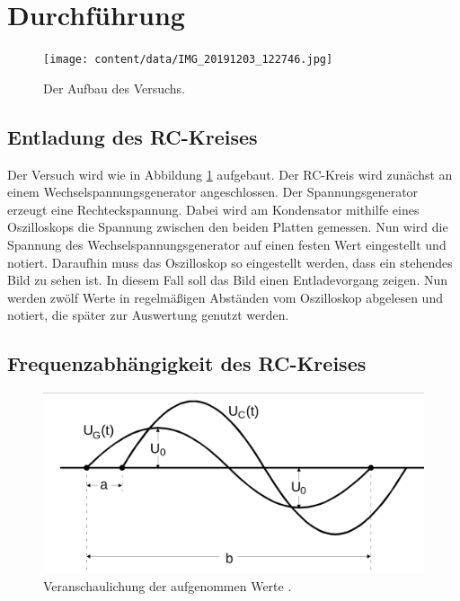 \section{Durchführung}
\label{sec:Durchführung}
\begin{figure}
    \centering
    \texttt{[image: content/data/IMG\_20191203\_122746.jpg]}
    \caption{Der Aufbau des Versuchs.}
    \label{fig:aufbau}
\end{figure}

\subsection{Entladung des RC-Kreises}
\label{sec:1}
Der Versuch wird wie in Abbildung \ref{fig:aufbau} aufgebaut.
Der RC-Kreis wird zunächst an einem Wechselspannungsgenerator angeschlossen.
Der Spannungsgenerator erzeugt eine Rechteckspannung.
Dabei wird am Kondensator mithilfe eines Oszilloskops die Spannung zwischen den beiden Platten gemessen.
Nun wird die Spannung des Wechselspannungsgenerator auf einen festen Wert eingestellt und notiert.
Daraufhin muss das Oszilloskop so eingestellt werden, dass ein stehendes Bild zu sehen ist. In diesem Fall soll das Bild einen Entladevorgang zeigen.
Nun werden zwölf Werte in regelmäßigen Abständen vom Oszilloskop abgelesen und notiert, die später zur Auswertung genutzt werden.
\FloatBarrier

\subsection{Frequenzabhängigkeit des RC-Kreises}
\begin{figure}
    \centering
    \includegraphics[width=\textwidth]{content/data/a_und_b.jpg}
    \caption{Veranschaulichung der aufgenommen Werte \cite[S.282]{anleitung}.}
    \label{fig:a_und_b}
\end{figure}

